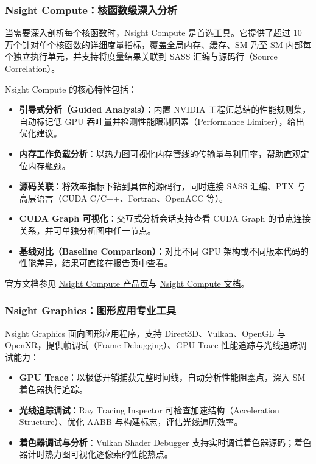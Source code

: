 \subsubsection{Nsight Compute：核函数级深入分析}

当需要深入剖析每个核函数时，Nsight Compute 是首选工具。它提供了超过 10 万个针对单个核函数的详细度量指标，覆盖全局内存、缓存、SM 乃至 SM 内部每个独立执行单元，并支持将度量结果关联到 SASS 汇编与源码行（Source Correlation）。

Nsight Compute 的核心特性包括：

\begin{itemize}
    \item \textbf{引导式分析（Guided Analysis）}：内置 NVIDIA 工程师总结的性能规则集，自动标记低 GPU 吞吐量并检测性能限制因素（Performance Limiter），给出优化建议。
    \item \textbf{内存工作负载分析}：以热力图可视化内存管线的传输量与利用率，帮助直观定位内存瓶颈。
    \item \textbf{源码关联}：将效率指标下钻到具体的源码行，同时连接 SASS 汇编、PTX 与高层语言（CUDA C/C++、Fortran、OpenACC 等）。
    \item \textbf{CUDA Graph 可视化}：交互式分析会话支持查看 CUDA Graph 的节点连接关系，并可单独分析图中任一节点。
    \item \textbf{基线对比（Baseline Comparison）}：对比不同 GPU 架构或不同版本代码的性能差异，结果可直接在报告页中查看。
\end{itemize}

官方文档参见 \href{https://developer.nvidia.com/nsight-compute}{Nsight Compute 产品页}与 \href{https://docs.nvidia.com/nsight-compute/}{Nsight Compute 文档}。

\subsubsection{Nsight Graphics：图形应用专业工具}

Nsight Graphics 面向图形应用程序，支持 Direct3D、Vulkan、OpenGL 与 OpenXR，提供帧调试（Frame Debugging）、GPU Trace 性能追踪与光线追踪调试能力：

\begin{itemize}
    \item \textbf{GPU Trace}：以极低开销捕获完整时间线，自动分析性能阻塞点，深入 SM 着色器执行追踪。
    \item \textbf{光线追踪调试}：Ray Tracing Inspector 可检查加速结构（Acceleration Structure）、优化 AABB 与构建标志，评估光线遍历效率。
    \item \textbf{着色器调试与分析}：Vulkan Shader Debugger 支持实时调试着色器源码；着色器计时热力图可视化逐像素的性能热点。
\end{itemize}

